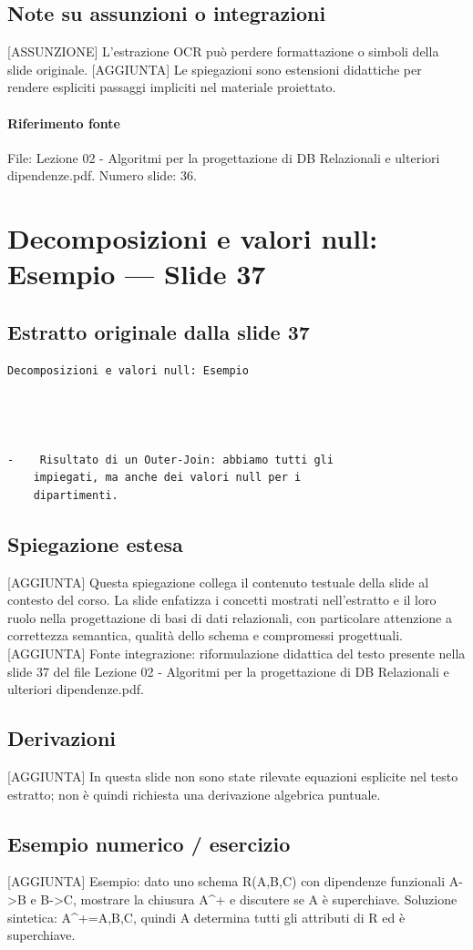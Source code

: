 \documentclass[11pt]{article}
\begin{document}
\subsection*{Note su assunzioni o integrazioni}
[ASSUNZIONE] L'estrazione OCR può perdere formattazione o simboli della slide originale.
[AGGIUNTA] Le spiegazioni sono estensioni didattiche per rendere espliciti passaggi impliciti nel materiale proiettato.
\paragraph{Riferimento fonte} File: Lezione 02 - Algoritmi per la progettazione di DB Relazionali e ulteriori dipendenze.pdf. Numero slide: 36.
\section{Decomposizioni e valori null: Esempio --- Slide 37}
\subsection*{Estratto originale dalla slide 37}
\begin{lstlisting}
Decomposizioni e valori null: Esempio




-    Risultato di un Outer-Join: abbiamo tutti gli
    impiegati, ma anche dei valori null per i
    dipartimenti.
\end{lstlisting}
\subsection*{Spiegazione estesa}
[AGGIUNTA] Questa spiegazione collega il contenuto testuale della slide al contesto del corso. La slide enfatizza i concetti mostrati nell'estratto e il loro ruolo nella progettazione di basi di dati relazionali, con particolare attenzione a correttezza semantica, qualità dello schema e compromessi progettuali.
[AGGIUNTA] Fonte integrazione: riformulazione didattica del testo presente nella slide 37 del file Lezione 02 - Algoritmi per la progettazione di DB Relazionali e ulteriori dipendenze.pdf.
\subsection*{Derivazioni}
[AGGIUNTA] In questa slide non sono state rilevate equazioni esplicite nel testo estratto; non è quindi richiesta una derivazione algebrica puntuale.
\subsection*{Esempio numerico / esercizio}
[AGGIUNTA] Esempio: dato uno schema R(A,B,C) con dipendenze funzionali A->B e B->C, mostrare la chiusura A^+ e discutere se A è superchiave. Soluzione sintetica: A^+={A,B,C}, quindi A determina tutti gli attributi di R ed è superchiave.
\end{document}
